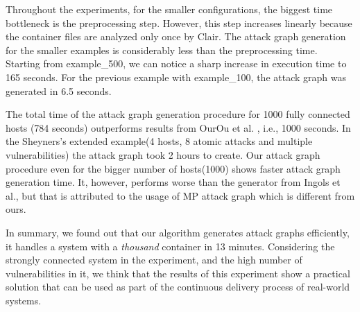 Throughout the experiments, for the smaller configurations, the biggest time bottleneck is the preprocessing step. However, this step increases linearly because the container files are analyzed only once by Clair. The attack graph generation for the smaller examples is considerably less than the preprocessing time. Starting from example\_500, we can notice a sharp increase in execution time to 165 seconds. For the previous example with example\_100, the attack graph was generated in  6.5 seconds.

The total time of the attack graph generation procedure for 1000 fully connected hosts (784 seconds) outperforms results from OurOu et al. \cite{ou2006scalable}, i.e., 1000 seconds. In the Sheyners's extended example(4 hosts, 8 atomic attacks and multiple vulnerabilities) the attack graph took 2 hours to create. Our attack graph procedure even for the bigger number of hosts(1000) shows faster attack graph generation time. It, however, performs worse than the generator from Ingols et al., but that is attributed to the usage of MP attack graph which is different from ours. 

In summary, we found out  that our algorithm generates  attack graphs efficiently, it handles a system with a \textit{thousand} container in 13 minutes. Considering the strongly connected system in the experiment, and the high number of vulnerabilities in it, we think that the results of this experiment show a practical solution that can be used as part of the continuous delivery process of real-world systems. 